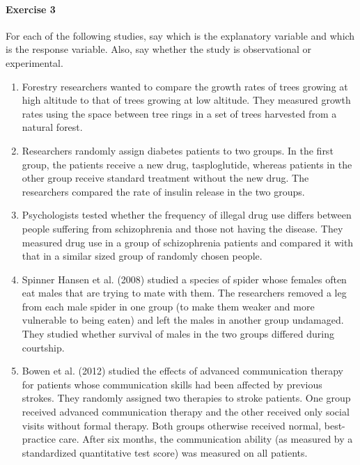 \documentclass[]{article}
\let\oldparagraph\paragraph
\renewcommand{\paragraph}[1]{\oldparagraph{#1}\mbox{}}
\begin{document}
\hypertarget{exercise-3}{%
\paragraph{Exercise 3}\label{exercise-3}}

For each of the following studies, say which is the explanatory variable
and which is the response variable. Also, say whether the study is
observational or experimental.

\begin{enumerate}
\def\labelenumi{\alph{enumi})}
\item
  Forestry researchers wanted to compare the growth rates of trees
  growing at high altitude to that of trees growing at low altitude.
  They measured growth rates using the space between tree rings in a set
  of trees harvested from a natural forest.
\item
  Researchers randomly assign diabetes patients to two groups. In the
  first group, the patients receive a new drug, tasploglutide, whereas
  patients in the other group receive standard treatment without the new
  drug. The researchers compared the rate of insulin release in the two
  groups.
\item
  Psychologists tested whether the frequency of illegal drug use differs
  between people suffering from schizophrenia and those not having the
  disease. They measured drug use in a group of schizophrenia patients
  and compared it with that in a similar sized group of randomly chosen
  people.
\item
  Spinner Hansen et al. (2008) studied a species of spider whose females
  often eat males that are trying to mate with them. The researchers
  removed a leg from each male spider in one group (to make them weaker
  and more vulnerable to being eaten) and left the males in another
  group undamaged. They studied whether survival of males in the two
  groups differed during courtship.
\item
  Bowen et al. (2012) studied the effects of advanced communication
  therapy for patients whose communication skills had been affected by
  previous strokes. They randomly assigned two therapies to stroke
  patients. One group received advanced communication therapy and the
  other received only social visits without formal therapy. Both groups
  otherwise received normal, best-practice care. After six months, the
  communication ability (as measured by a standardized quantitative test
  score) was measured on all patients.
\end{enumerate}
\end{document}
